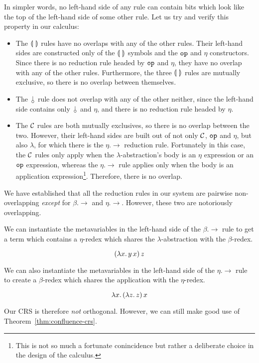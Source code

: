 In simpler words, no left-hand side of any rule can contain bits which look
like the top of the left-hand side of some other rule. Let us try and
verify this property in our calculus:
\begin{itemize}
\item The $\llparenthesis \,  \, \rrparenthesis$ rules have no overlaps with any of the other
  rules. Their left-hand sides are constructed only of the $\llparenthesis \,  \, \rrparenthesis$
  symbols and the $\mathtt{op}$ and $\eta$ constructors. Since there is no
  reduction rule headed by $\mathtt{op}$ and $\eta$, they have no overlap with
  any of the other rules. Furthermore, the three $\llparenthesis \,  \, \rrparenthesis$ rules are
  mutually exclusive, so there is no overlap between themselves.
\item The $\cherry$ rule does not overlap with any of the other neither,
  since the left-hand side contains only $\cherry$ and $\eta$, and there is
  no reduction rule headed by $\eta$.
\item The $\mathcal{C}$ rules are both mutually exclusives, so there is no overlap
  between the two. However, their left-hand sides are built out of not only
  $\mathcal{C}$, $\mathtt{op}$ and $\eta$, but also $\lambda$, for which there is the
  $\eta.\to$ reduction rule. Fortunately in this case, the $\mathcal{C}$ rules only
  apply when the $\lambda$-abstraction's body is an $\eta$ expression or an
  $\mathtt{op}$ expression, whereas the $\eta.\to$ rule applies only when the
  body is an application expression\footnote{This is not so much a
    fortunate conincidence but rather a deliberate choice in the design of
    the calculus.}. Therefore, there is no overlap.
\end{itemize}

We have established that all the reduction rules in our system are pairwise
non-overlapping \emph{except} for $\beta.\to$ and $\eta.\to$. However,
these two are notoriously overlapping.

We can instantiate the metavariables in the left-hand side of the
$\beta.\to$ rule to get a term which contains a $\eta$-redex which shares
the $\lambda$-abstraction with the $\beta$-redex.

$$
(\lambda x.\, y\,x)\,z
$$

We can also instantiate the metavariables in the left-hand side of the
$\eta.\to$ rule to create a $\beta$-redex which shares the application with
the $\eta$-redex.

$$
\lambda x.\, (\lambda z.\, z)\,x
$$

Our CRS is therefore \emph{not} orthogonal. However, we can still make good
use of Theorem~\ref{thm:confluence-crs}.

